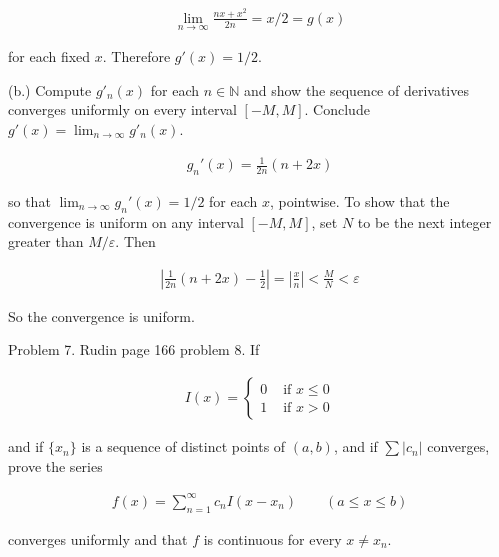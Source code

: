 \documentclass{article}
\begin{document}
  \vspace{1cm}

  \begin{align*}
    \lim_{n\to\infty} \frac{nx+x^2}{2n} = x/2 = g(x)
  \end{align*}

  for each fixed $x$.  Therefore $g'(x)=1/2$.

  \vspace{1cm}

  {\Large \color{Sepia} (b.) Compute $g'_n(x)$ for each $n\in\mathbb N$ and show the sequence of derivatives converges uniformly on every interval $[-M,M]$.  Conclude $\displaystyle g'(x)=\lim_{n\to \infty}g'_n(x)$.  }

  \vspace{1cm}

  \begin{align*}
    g_n'(x) = \frac{1}{2n}(n+2x)
  \end{align*}

  so that $\lim_{n\to \infty}g_n'(x) = 1/2$ for each $x$, pointwise.  To show that the convergence is uniform on any interval $[-M,M]$, set $N$ to be the next integer greater than $M/\varepsilon$.  Then 

  \begin{align*}
    \left| \frac{1}{2n}(n+2x)-\frac 1 2 \right| = \left| \frac{x}{n}\right| < \frac{M}{N} < \varepsilon
  \end{align*}

  So the convergence is uniform.

  \pagebreak

  {\Large \color{Sepia} Problem 7. Rudin page 166 problem 8.  If 
  
  \begin{align*}
      I(x)=\begin{cases} 0 & \text{ if } x \le 0 \\ 
      1 & \text{ if } x > 0
      \end{cases}
  \end{align*}

  and if $\{x_n\}$ is a sequence of distinct points of $(a,b)$, and if $\sum |c_n|$ converges, prove the series 

  \begin{align*}
    f(x) = \sum_{n=1}^\infty c_n I(x-x_n) \qquad (a\leq x\leq b)
  \end{align*}

  converges uniformly and that $f$ is continuous for every $x\ne x_n$.
  
  }
\end{document}
